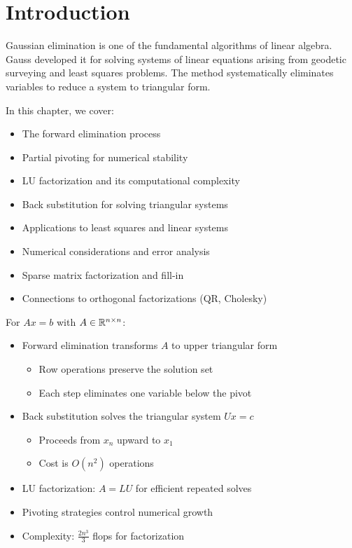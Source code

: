 \section{Introduction}

Gaussian elimination  is one of the fundamental algorithms of linear algebra. Gauss developed it for solving systems of linear equations arising from geodetic surveying  and least squares problems. The method systematically eliminates variables to reduce a system to triangular form.

In this chapter, we cover:
\begin{itemize}
    \item The forward elimination process
    \item Partial pivoting  for numerical stability
    \item LU factorization  and its computational complexity
    \item Back substitution for solving triangular systems
    \item Applications to least squares and linear systems
    \item Numerical considerations and error analysis
    \item Sparse matrix  factorization and fill-in
    \item Connections to orthogonal factorizations (QR, Cholesky)
\end{itemize}

For $Ax = b$ with $A \in \mathbb{R}^{n\times n}$:
\begin{itemize}
    \item Forward elimination transforms $A$ to upper triangular form
    \begin{itemize}
        \item Row operations preserve the solution set
        \item Each step eliminates one variable below the pivot
    \end{itemize}
    \item Back substitution solves the triangular system $Ux = c$
    \begin{itemize}
        \item Proceeds from $x_n$ upward to $x_1$
        \item Cost is $O(n^2)$ operations
    \end{itemize}
\end{itemize}
\begin{itemize}
    \item LU factorization: $A = LU$ for efficient repeated solves
    \item Pivoting strategies control numerical growth
    \item Complexity: $\frac{2n^3}{3}$ flops for factorization
\end{itemize}

